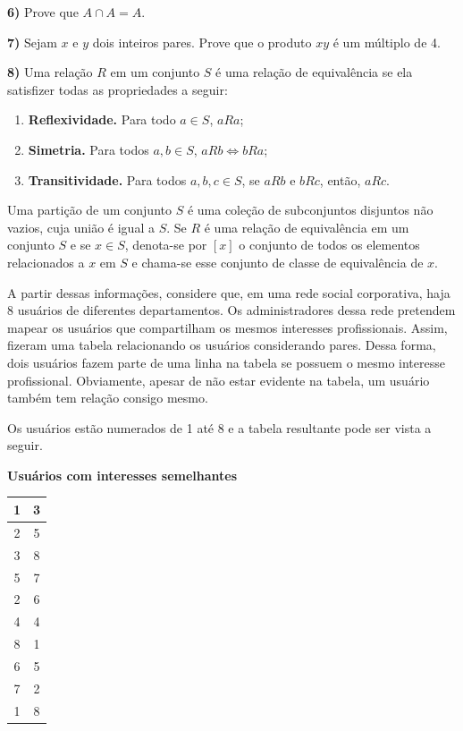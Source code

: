 \documentclass[12pt,a4paper]{article}
\newcommand{\resposta}[1]{
\noindent
\framebox[\textwidth]{
\begin{minipage}{0.98\textwidth}
\vspace{#1}
\end{minipage}
}
}
\begin{document}
\vspace{0.8cm}

\textbf{6)} Prove que $A \cap A = A$.

\vspace{0.2cm}
\resposta{5cm}

\vspace{0.8cm}

\textbf{7)} Sejam $x$ e $y$ dois inteiros pares. Prove que o produto $xy$ é um múltiplo de 4.

\vspace{0.2cm}
\resposta{4cm}

\vspace{0.8cm}

\textbf{8) } Uma relação $R$ em um conjunto $S$ é uma relação de equivalência se ela satisfizer todas as propriedades a seguir:
\begin{enumerate}
    \item \textbf{Reflexividade.} Para todo $a \in S$, $a R a$;
    \item \textbf{Simetria.} Para todos $a, b \in S$, $a R b \Leftrightarrow b R a$;
    \item \textbf{Transitividade.} Para todos $a, b, c \in S$, se $a R b$ e $b R c$, então, $a R c$.
\end{enumerate}

Uma partição de um conjunto $S$ é uma coleção de subconjuntos disjuntos não vazios, cuja união é igual a $S$. Se $R$ é uma relação de equivalência em um conjunto $S$ e se $x \in S$, denota-se por $[x]$ o conjunto de todos os elementos relacionados a $x$ em $S$ e chama-se esse conjunto de classe de equivalência de $x$.

A partir dessas informações, considere que, em uma rede social corporativa, haja 8 usuários de diferentes departamentos. Os administradores dessa rede pretendem mapear os usuários que compartilham os mesmos interesses profissionais. Assim, fizeram uma tabela relacionando os usuários considerando pares. Dessa forma, dois usuários fazem parte de uma linha na tabela se possuem o mesmo interesse profissional. Obviamente, apesar de não estar evidente na tabela, um usuário também tem relação consigo mesmo.

Os usuários estão numerados de 1 até 8 e a tabela resultante pode ser vista a seguir.

\begin{center}
\textbf{Usuários com interesses semelhantes} \\
\vspace{0.2cm}
\begin{tabular}{|c|c|}
\hline
1 & 3 \\ \hline
2 & 5 \\ \hline
3 & 8 \\ \hline
5 & 7 \\ \hline
2 & 6 \\ \hline
4 & 4 \\ \hline
8 & 1 \\ \hline
6 & 5 \\ \hline
7 & 2 \\ \hline
1 & 8 \\ \hline
\end{tabular}
\end{center}
\end{document}
